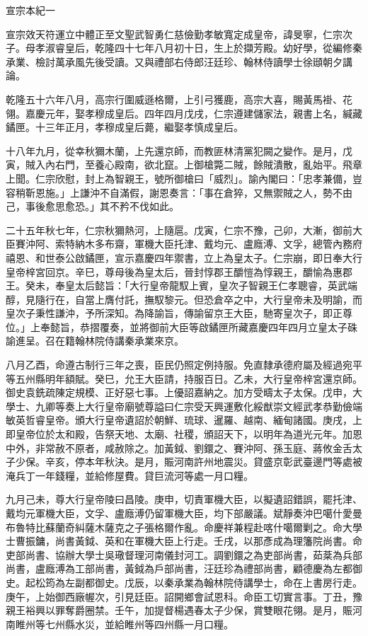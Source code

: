 
\begin{pinyinscope}
宣宗本紀一

宣宗效天符運立中體正至文聖武智勇仁慈儉勤孝敏寬定成皇帝，諱旻寧，仁宗次子。母孝淑睿皇后，乾隆四十七年八月初十日，生上於擷芳殿。幼好學，從編修秦承業、檢討萬承風先後受讀。又與禮部右侍郎汪廷珍、翰林侍讀學士徐頲朝夕講論。

乾隆五十六年八月，高宗行圍威遜格爾，上引弓獲鹿，高宗大喜，賜黃馬褂、花翎。嘉慶元年，娶孝穆成皇后。四年四月戊戌，仁宗遵建儲家法，親書上名，緘藏鐍匣。十三年正月，孝穆成皇后薨，繼娶孝慎成皇后。

十八年九月，從幸秋獮木蘭，上先還京師，而教匪林清黨犯闕之變作。是月，戊寅，賊入內右門，至養心殿南，欲北竄。上御槍斃二賊，餘賊潰散，亂始平。飛章上聞。仁宗欣慰，封上為智親王，號所御槍曰「威烈」。諭內閣曰：「忠孝兼備，豈容稍靳恩施。」上謙沖不自滿假，謝恩奏言：「事在倉猝，又無禦賊之人，勢不由己，事後愈思愈恐。」其不矜不伐如此。

二十五年秋七年，仁宗秋獮熱河，上隨扈。戊寅，仁宗不豫，己卯，大漸，御前大臣賽沖阿、索特納木多布齋，軍機大臣托津、戴均元、盧廕溥、文孚，總管內務府禧恩、和世泰公啟鐍匣，宣示嘉慶四年禦書，立上為皇太子。仁宗崩，即日奉大行皇帝梓宮回京。辛巳，尊母後為皇太后，晉封惇郡王釂愷為惇親王，釂愉為惠郡王。癸未，奉皇太后懿旨：「大行皇帝龍馭上賓，皇次子智親王仁孝聰睿，英武端醇，見隨行在，自當上膺付託，撫馭黎元。但恐倉卒之中，大行皇帝未及明諭，而皇次子秉性謙沖，予所深知。為降諭旨，傳諭留京王大臣，馳寄皇次子，即正尊位。」上奉懿旨，恭摺覆奏，並將御前大臣等啟鐍匣所藏嘉慶四年四月立皇太子硃諭進呈。召在籍翰林院侍講秦承業來京。

八月乙酉，命遵古制行三年之喪，臣民仍照定例持服。免直隸承德府屬及經過宛平等五州縣明年額賦。癸巳，允王大臣請，持服百日。乙未，大行皇帝梓宮還京師。御史袁銑疏陳定規模、正好惡七事。上優詔嘉納之。加方受疇太子太保。戊申，大學士、九卿等奏上大行皇帝廟號尊謚曰仁宗受天興運敷化綏猷崇文經武孝恭勤儉端敏英哲睿皇帝。頒大行皇帝遺詔於朝鮮、琉球、暹羅、越南、緬甸諸國。庚戌，上即皇帝位於太和殿，告祭天地、太廟、社稷，頒詔天下，以明年為道光元年。加恩中外，非常赦不原者，咸赦除之。加黃鉞、劉鐶之、賽沖阿、孫玉庭、蔣攸金舌太子少保。辛亥，停本年秋決。是月，賑河南許州地震災。貸盛京彰武臺邊門等處被淹兵丁一年錢糧，並給修屋費。貸巨流河等處一月口糧。

九月己未，尊大行皇帝陵曰昌陵。庚申，切責軍機大臣，以擬遺詔錯誤，罷托津、戴均元軍機大臣，文孚、盧廕溥仍留軍機大臣，均下部嚴議。斌靜奏沖巴噶什愛曼布魯特比蘇蘭奇糾薩木薩克之子張格爾作亂。命慶祥兼程赴喀什噶爾剿之。命大學士曹振鏞，尚書黃鉞、英和在軍機大臣上行走。壬戌，以那彥成為理籓院尚書。命吏部尚書、協辦大學士吳璥督理河南儀封河工。調劉鐶之為吏部尚書，茹棻為兵部尚書，盧廕溥為工部尚書，黃鉞為戶部尚書，汪廷珍為禮部尚書，顧德慶為左都御史。起松筠為左副都御史。戊辰，以秦承業為翰林院侍講學士，命在上書房行走。庚午，上始御西廠幄次，引見廷臣。詔開鄉會試恩科。命臣工切實言事。丁丑，豫親王裕興以罪奪爵圈禁。壬午，加提督楊遇春太子少保，賞雙眼花翎。是月，賑河南睢州等七州縣水災，並給睢州等四州縣一月口糧。


\end{pinyinscope}
